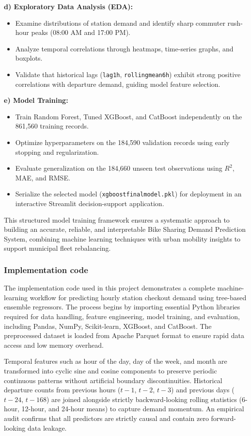 \documentclass[12pt, a4paper]{article}
\renewcommand{\_}{\textunderscore\allowbreak}
\begin{document}
\noindent \textbf{d) Exploratory Data Analysis (EDA):}
\begin{itemize}
    \item Examine distributions of station demand and identify sharp commuter rush-hour peaks (08:00 AM and 17:00 PM).
    \item Analyze temporal correlations through heatmaps, time-series graphs, and boxplots.
    \item Validate that historical lags (\texttt{lag\_1h}, \texttt{rolling\_mean\_6h}) exhibit strong positive correlations with departure demand, guiding model feature selection.
\end{itemize}

\noindent \textbf{e) Model Training:}
\begin{itemize}
    \item Train Random Forest, Tuned XGBoost, and CatBoost independently on the 861,560 training records.
    \item Optimize hyperparameters on the 184,590 validation records using early stopping and regularization.
    \item Evaluate generalization on the 184,660 unseen test observations using $R^2$, MAE, and RMSE.
    \item Serialize the selected model (\texttt{xgboost\_final\_model.pkl}) for deployment in an interactive Streamlit decision-support application.
\end{itemize}

This structured model training framework ensures a systematic approach to building an accurate, reliable, and interpretable Bike Sharing Demand Prediction System, combining machine learning techniques with urban mobility insights to support municipal fleet rebalancing.

\subsubsection{Implementation code}
The implementation code used in this project demonstrates a complete machine-learning workflow for predicting hourly station checkout demand using tree-based ensemble regressors. The process begins by importing essential Python libraries required for data handling, feature engineering, model training, and evaluation, including Pandas, NumPy, Scikit-learn, XGBoost, and CatBoost. The preprocessed dataset is loaded from Apache Parquet format to ensure rapid data access and low memory overhead.

Temporal features such as hour of the day, day of the week, and month are transformed into cyclic sine and cosine components to preserve periodic continuous patterns without artificial boundary discontinuities. Historical departure counts from previous hours ($t-1$, $t-2$, $t-3$) and previous days ($t-24$, $t-168$) are joined alongside strictly backward-looking rolling statistics (6-hour, 12-hour, and 24-hour means) to capture demand momentum. An empirical audit confirms that all predictors are strictly causal and contain zero forward-looking data leakage.
\end{document}
